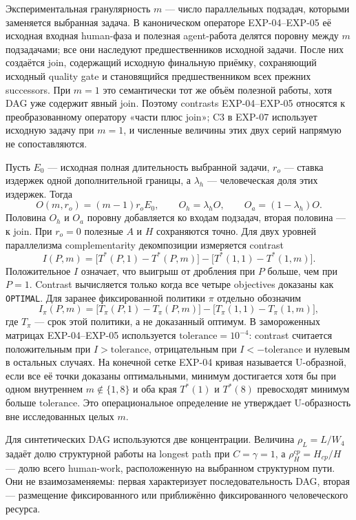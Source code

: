 Экспериментальная гранулярность $m$ --- число параллельных подзадач, которыми
заменяется выбранная задача. В каноническом операторе EXP-04--EXP-05 её
исходная входная human-фаза и полезная agent-работа делятся поровну между $m$
подзадачами; все они наследуют предшественников исходной задачи. После них
создаётся join, содержащий исходную финальную приёмку, сохраняющий исходный
quality gate и становящийся предшественником всех прежних successors. При
$m=1$ это семантически тот же объём полезной работы, хотя DAG уже содержит
явный join. Поэтому contrasts EXP-04--EXP-05 относятся к преобразованному
оператору «части плюс join»; C3 в EXP-07 использует исходную задачу при $m=1$, и
численные величины этих двух серий напрямую не сопоставляются.

Пусть $E_0$ --- исходная полная длительность выбранной задачи, $r_o$ --- ставка
издержек одной дополнительной границы, а $\lambda_h$ --- человеческая доля
этих издержек. Тогда
\[
  O(m,r_o)=(m-1)r_oE_0,\qquad
  O_h=\lambda_hO,\qquad O_a=(1-\lambda_h)O.
\]
Половина $O_h$ и $O_a$ поровну добавляется ко входам подзадач, вторая половина
--- к join. При $r_o=0$ полезные $A$ и $H$ сохраняются точно. Для двух уровней
параллелизма complementarity декомпозиции измеряется contrast
\begin{equation}
  I(P,m)=\bigl[T^*(P,1)-T^*(P,m)\bigr]
  -\bigl[T^*(1,1)-T^*(1,m)\bigr].
  \label{eq:interaction-contrast}
\end{equation}
Положительное $I$ означает, что выигрыш от дробления при $P$ больше, чем при
$P=1$. Contrast вычисляется только когда все четыре objectives доказаны как
\texttt{OPTIMAL}. Для заранее фиксированной политики $\pi$ отдельно обозначим
\[
  I_{\pi}(P,m)=\bigl[T_{\pi}(P,1)-T_{\pi}(P,m)\bigr]
  -\bigl[T_{\pi}(1,1)-T_{\pi}(1,m)\bigr],
\]
где $T_{\pi}$ --- срок этой политики, а не доказанный оптимум. В замороженных
матрицах EXP-04--EXP-05 используется
$\mathrm{tolerance}=10^{-4}$: contrast считается положительным при
$I>\mathrm{tolerance}$, отрицательным при $I<-\mathrm{tolerance}$ и нулевым в
остальных случаях. На конечной сетке EXP-04 кривая называется U-образной, если
все её точки доказаны оптимальными, минимум достигается хотя бы при одном
внутреннем $m\notin\{1,8\}$ и оба края $T^*(1)$ и $T^*(8)$ превосходят минимум
больше $\mathrm{tolerance}$. Это операциональное определение не утверждает U-образность
вне исследованных целых $m$.

Для синтетических DAG используются две концентрации. Величина
$\rho_L=L/W_4$ задаёт долю структурной работы на longest path при
$C=\gamma=1$, а $\rho_H^{cp}=H_{cp}/H$ --- долю всего human-work,
расположенную на выбранном структурном пути. Они не взаимозаменяемы: первая
характеризует последовательность DAG, вторая --- размещение фиксированного или
приближённо фиксированного человеческого ресурса.

